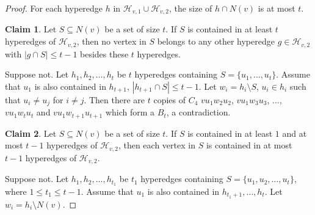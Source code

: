 \documentclass[11pt,a4paper]{article}
\theoremstyle{definition}
\newtheorem{claimthm}{Claim}[section]
\newenvironment{claimproof}
  {\renewcommand{\qedsymbol}{\ensuremath{\blacksquare}}\proof}
  {\endproof}
  {\endproof}
\begin{document}
\begin{proof}
            For each hyperedge $h$ in $\mathcal{H}_{v, 1} \cup \mathcal{H}_{v, 2}$, the size of $h \cap N(v)$ is at most $t$.

            \begin{claimthm}\label{cla: 213}
                Let $S \subseteq N(v)$ be a set of size $t$.
                If $S$ is contained in at least $t$ hyperedges of $\mathcal{H}_{v, 2}$, then no vertex in $S$ belongs to any other hyperedge $g \in \mathcal{H}_{v, 2}$ with $|g \cap S| \leq t-1$ besides these $t$ hyperedges.
            \end{claimthm}
            \begin{claimproof}
                Suppose not. Let $h_1, h_2, \dots, h_t$ be $t$ hyperedges containing $S = \{u_1, \dots, u_t\}$.
                Assume that $u_1$ is also contained in $h_{t+1}$, $|h_{t+1} \cap S| \leq t-1$.
                Let $w_i = h_i \setminus S$, $u_i \in h_i$ such that $u_i \neq u_j$ for $i \neq j$.
                Then there are $t$ copies of $C_4$ $v u_1 w_2 u_2$, $v u_1 w_3 u_3$, $\dots$, $v u_1 w_t u_t$ and $v u_1 w_{t+1} u_{t+1}$ which form a $B_t$, a contradiction.
            \end{claimproof}

            \begin{claimthm}\label{cla: 214}
                Let $S \subseteq N(v)$ be a set of size $t$.
                If $S$ is contained in at least $1$ and at most $t-1$ hyperedges of $\mathcal{H}_{v, 2}$, then each vertex in $S$ is contained in at most $t-1$ hyperedges of $\mathcal{H}_{v, 2}$.
            \end{claimthm}
            \begin{claimproof}
                Suppose not. Let $h_1, h_2, \dots, h_{t_1}$ be $t_1$ hyperedges containing $S = \{u_1, u_2, \dots, u_t\}$, where $1 \leq t_1 \leq t-1$.
                Assume that $u_1$ is also contained in $h_{t_1 + 1}, \dots, h_t$.
                Let $w_i = h_i \setminus N(v)$.


\end{claimproof}
\end{proof}
\end{document}
